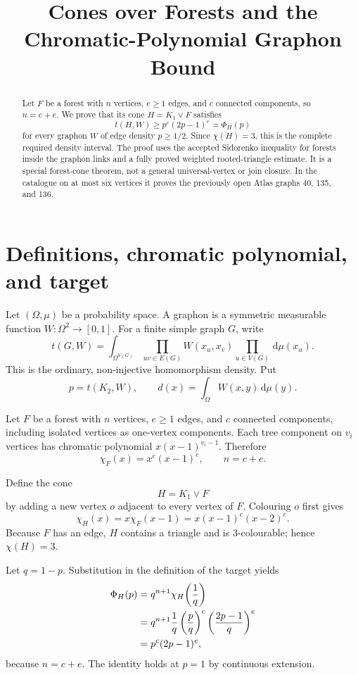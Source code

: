 \documentclass[11pt]{article}
\title{Cones over Forests and the Chromatic-Polynomial Graphon Bound}
\author{}
\date{}
\newcommand{\dd}{\,\mathrm{d}}
\newcommand{\join}{\mathbin{\vee}}
\begin{document}
\maketitle

\begin{abstract}
Let $F$ be a forest with $n$ vertices, $e\geq1$ edges, and $c$ connected
components, so $n=c+e$.  We prove that its cone
$H=K_1\join F$ satisfies
\[
t(H,W)\geq p^c(2p-1)^e=\Phi_H(p)
\]
for every graphon $W$ of edge density $p\geq1/2$.  Since
$\chi(H)=3$, this is the complete required density interval.  The proof
uses the accepted Sidorenko inequality for forests inside the graphon
links and a fully proved weighted rooted-triangle estimate.  It is a
special forest-cone theorem, not a general universal-vertex or join
closure.  In the catalogue on at most six vertices it proves the
previously open Atlas graphs 40, 135, and 136.
\end{abstract}


\section{Definitions, chromatic polynomial, and target}

Let $(\Omega,\mu)$ be a probability space.  A graphon is a symmetric
measurable function $W\colon\Omega^2\to[0,1]$.  For a finite simple
graph $G$, write
\[
t(G,W)
=
\int_{\Omega^{V(G)}}
\prod_{uv\in E(G)}W(x_u,x_v)
\prod_{u\in V(G)}\dd\mu(x_u).
\]
This is the ordinary, non-injective homomorphism density.  Put
\[
p=t(K_2,W),
\qquad
d(x)=\int_\Omega W(x,y)\dd\mu(y).
\]

Let $F$ be a forest with $n$ vertices, $e\geq1$ edges, and $c$
connected components, including isolated vertices as one-vertex
components.  Each tree component on $v_i$ vertices has chromatic
polynomial $x(x-1)^{v_i-1}$.  Therefore
\[
\chi_F(x)=x^c(x-1)^e,
\qquad
n=c+e.
\]

Define the cone
\[
H=K_1\join F
\]
by adding a new vertex $o$ adjacent to every vertex of $F$.  Colouring
$o$ first gives
\begin{equation}
\chi_H(x)
=x\chi_F(x-1)
=x(x-1)^c(x-2)^e.
\label{eq:chromatic}
\end{equation}
Because $F$ has an edge, $H$ contains a triangle and is $3$-colourable;
hence $\chi(H)=3$.

Let $q=1-p$.  Substitution in the definition of the target yields
\begin{align}
\Phi_H(p)
&=
q^{n+1}
\chi_H\!\left(\frac1q\right)
\notag\\
&=
q^{n+1}\frac1q
\left(\frac pq\right)^c
\left(\frac{2p-1}{q}\right)^e
\notag\\
&=p^c(2p-1)^e,
\label{eq:target}
\end{align}
because $n=c+e$.  The identity holds at $p=1$ by continuous extension.
\end{document}
